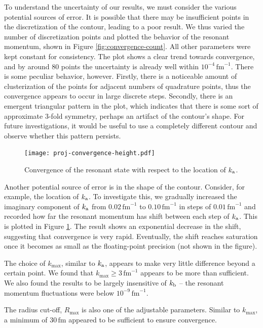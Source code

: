 \documentclass[amsmath, amssymb, aps, floatfix, nofootinbib, preprintnumbers,
  showpacs, superscriptaddress, twocolumn]{revtex4-1}
\begin{document}
To understand the uncertainty of our results, we must consider the various
potential sources of error.  It is possible that there may be insufficient
points in the discretization of the contour, leading to a poor result.  We
thus varied the number of discretization points and plotted the behavior of
the resonant momentum, shown in Figure \ref{fig:convergence-count}.  All other
parameters were kept constant for consistency.  The plot shows a clear trend
towards convergence, and by around 80 points the uncertainty is already well
within $10^{-4}\,\mathrm{fm}^{-1}$.  There is some peculiar behavior, however.
Firstly, there is a noticeable amount of clusterization of the points for
adjacent numbers of quadrature points, thus the convergence appears to occur
in large discrete steps.  Secondly, there is an emergent triangular pattern in
the plot, which indicates that there is some sort of approximate 3-fold
symmetry, perhaps an artifact of the contour's shape.  For future
investigations, it would be useful to use a completely different contour and
observe whether this pattern persists.

\begin{figure}
  \texttt{[image: proj-convergence-height.pdf]}
  \caption{Convergence of the resonant state with respect to the location of
    $k_{\text a}$.}
  \label{fig:convergence-height}
\end{figure}

Another potential source of error is in the shape of the contour.  Consider,
for example, the location of $k_{\text a}$.  To investigate this, we gradually
increased the imaginary component of $k_{\text a}$ from
$0.02\,\mathrm{fm}^{-1}$ to $0.10\,\mathrm{fm}^{-1}$ in steps of
$0.01\,\mathrm{fm}^{-1}$ and recorded how far the resonant momentum has shift
between each step of $k_{\text a}$.  This is plotted in Figure
\ref{fig:convergence-height}.  The result shows an exponential decrease in the
shift, suggesting that convergence is very rapid.  Eventually, the shift
reaches saturation once it becomes as small as the floating-point precision
(not shown in the figure).

The choice of $k_{\text{max}}$, similar to $k_{\text a}$, appears to make very
little difference beyond a certain point.  We found that
$k_{\text{max}} \ge 3\,\mathrm{fm}^{-1}$ appears to be more than sufficient.
We also found the results to be largely insensitive of $k_{\text b}$ -- the
resonant momentum fluctuations were below $10^{-9}\,\mathrm{fm}^{-1}$.

The radius cut-off, $R_{\text{max}}$ is also one of the adjustable parameters.
Similar to $k_{\text{max}}$, a minimum of $30\,\mathrm{fm}$ appeared to be
sufficient to ensure convergence.
\end{document}
